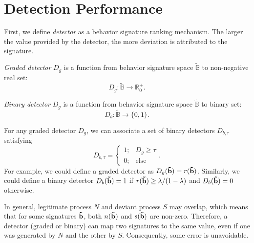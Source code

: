 %
%
\section{Detection Performance}
First, we define \emph{detector} as a behavior signature ranking mechanism. The larger the value provided by the detector, the more deviation is attributed to the signature.
\begin{definition}
	\emph{Graded detector} $D_g$ is a function from behavior signature space $\tilde{\mathbb{B}}$ to non-negative real set:
	$$
	D_g: \tilde{\mathbb{B}} \rightarrow \mathbb{R}_0^+.
	$$
\end{definition}
\begin{definition}
	\emph{Binary detector} $D_g$ is a function from behavior signature space $\tilde{\mathbb{B}}$ to binary set:
	$$
	D_b: \tilde{\mathbb{B}} \rightarrow \{0,1\}.
	$$
\end{definition}
\noindent
For any graded detector $D_g$, we can associate a set of binary detectors $D_{b, \tau}$ satisfying
\begin{equation}
		D_{b, \tau} = \begin{cases}
		   1; & D_g \geq \tau \\
		   0; & \text{else }
		  \end{cases}.
\label{eq:freq-n}
\end{equation}
\noindent
For example, we could define a graded detector as $D_g(\mathbf{\tilde{b}})=r(\mathbf{\tilde{b}})$. Similarly, we could define a binary detector $D_b(\mathbf{\tilde{b}})=1$ if $r(\mathbf{\tilde{b}}) \geq \lambda/(1-\lambda)$ and $D_b(\mathbf{\tilde{b}})=0$ otherwise.

In general, legitimate process $N$ and deviant process $S$ may overlap, which means that for some signatures $\mathbf{\tilde{b}}$, both $n(\mathbf{\tilde{b}})$ and $s(\mathbf{\tilde{b}})$ are non-zero. Therefore, a detector (graded or binary) can map two signatures to the same value, even if one was generated by $N$ and the other by $S$. Consequently, some error is unavoidable.

